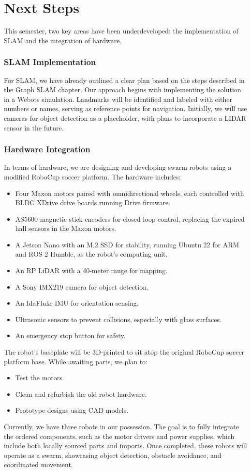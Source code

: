 \chapter{Next Steps}

This semester, two key areas have been underdeveloped: the implementation of SLAM and the integration of hardware.

\subsection*{SLAM Implementation}
For SLAM, we have already outlined a clear plan based on the steps described in the Graph SLAM chapter. Our approach begins with implementing the solution in a Webots simulation. Landmarks will be identified and labeled with either numbers or names, serving as reference points for navigation. Initially, we will use cameras for object detection as a placeholder, with plans to incorporate a LIDAR sensor in the future.

\subsection*{Hardware Integration}
In terms of hardware, we are designing and developing swarm robots using a modified RoboCup soccer platform. The hardware includes:
\begin{itemize}
    \item Four Maxon motors paired with omnidirectional wheels, each controlled with BLDC XDrive drive boards running Drive firmware.
    \item AS5600 magnetic stick encoders for closed-loop control, replacing the expired hall sensors in the Maxon motors.
    \item A Jetson Nano with an M.2 SSD for stability, running Ubuntu 22 for ARM and ROS 2 Humble, as the robot’s computing unit.
    \item An RP LiDAR with a 40-meter range for mapping.
    \item A Sony IMX219 camera for object detection.
    \item An IdaFluke IMU for orientation sensing.
    \item Ultrasonic sensors to prevent collisions, especially with glass surfaces.
    \item An emergency stop button for safety.
\end{itemize}

The robot’s baseplate will be 3D-printed to sit atop the original RoboCup soccer platform base. While awaiting parts, we plan to:
\begin{itemize}
    \item Test the motors.
    \item Clean and refurbish the old robot hardware.
    \item Prototype designs using CAD models.
\end{itemize}

Currently, we have three robots in our possession. The goal is to fully integrate the ordered components, such as the motor drivers and power supplies, which include both locally sourced parts and imports. Once completed, these robots will operate as a swarm, showcasing object detection, obstacle avoidance, and coordinated movement.
